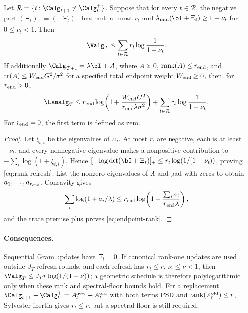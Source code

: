 \begin{lemma}\label{lem:rank-refresh}
Let $\mathcal R=\{t:\Calg_{t+1}\ne\Calg_t^+\}$.  Suppose that for every
$t\in\mathcal R$, the negative part $(\Xi_t)_-=(-\Xi_t)_+$ has rank at
most $r_t$ and
$\lambda_{\min}(\bI+\Xi_t)\ge1-\nu_t$ for $0\le\nu_t<1$.  Then
\begin{equation}\label{eq:rank-refresh}
 \Valg_T\le\sum_{t\in\mathcal R}r_t\log\frac1{1-\nu_t}.
\end{equation}
If additionally
$\Calg_{T+1}=\lambda\bI+A$, where $A\succeq0$,
$\operatorname{rank}(A)\le r_{\rm end}$, and
$\operatorname{tr}(A)\le W_{\rm end}G^2/\sigma^2$ for a specified total
endpoint weight $W_{\rm end}\ge0$, then, for $r_{\rm end}>0$,
\begin{equation}\label{eq:endpoint-rank}
 \Lamalg_T\le r_{\rm end}\log\!\left(
 1+\frac{W_{\rm end}G^2}{r_{\rm end}\lambda\sigma^2}\right)
 +\sum_{t\in\mathcal R}r_t\log\frac1{1-\nu_t}.
\end{equation}
For $r_{\rm end}=0$, the first term is defined as zero.
\end{lemma}
\begin{proof}
Let $\xi_{t,i}$ be the eigenvalues of $\Xi_t$.  At most $r_t$ are
negative, each is at least $-\nu_t$, and every nonnegative eigenvalue makes
a nonpositive contribution to $-\sum_i\log(1+\xi_{t,i})$.  Hence
$[-\log\det(\bI+\Xi_t)]_+\le r_t\log(1/(1-\nu_t))$, proving
\eqref{eq:rank-refresh}.  List the nonzero eigenvalues of $A$ and pad with
zeros to obtain $a_1,\ldots,a_{r_{\rm end}}$.  Concavity gives
\[
 \sum_i\log(1+a_i/\lambda)
 \le r_{\rm end}\log\!\left(1+
 \frac{\sum_i a_i}{r_{\rm end}\lambda}\right),
\]
and the trace premise plus  proves
\eqref{eq:endpoint-rank}.
\end{proof}

\paragraph{Consequences.}
Sequential Gram updates have $\Xi_t=0$.  If canonical rank-one updates are
used outside $J_T$ refresh rounds, and each refresh has
$r_t\le r$, $\nu_t\le\nu<1$, then
$\Valg_T\le J_Tr\log(1/(1-\nu))$; a geometric schedule is therefore
polylogarithmic only when these rank and spectral-floor bounds hold.
For a replacement
$\Calg_{t+1}-\Calg_t^+=A_t^{\rm new}-A_t^{\rm old}$ with both terms PSD
and $\operatorname{rank}(A_t^{\rm old})\le r$, Sylvester inertia gives
$r_t\le r$, but a spectral floor is still required.

